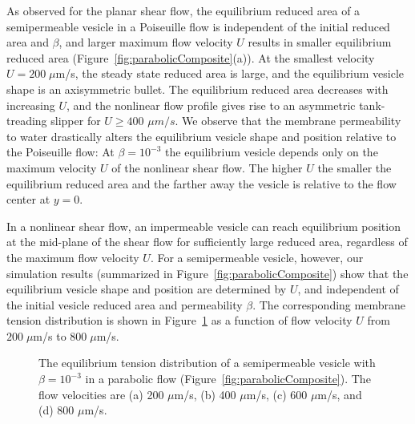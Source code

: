 \documentclass[prb,preprint,showpacs,preprintnumbers,amsmath,amssymb,longbibliography]{revtex4-1}
\begin{document}
As observed for the planar shear flow, the equilibrium reduced area of a
semipermeable vesicle in a Poiseuille flow is independent of the initial
reduced area and $\beta$, and  larger maximum flow velocity $U$ results
in smaller equilibrium reduced area
(Figure~\ref{fig:parabolicComposite}(a)). At the smallest velocity $U=
200\; \mu$m/s, the steady state reduced area is large, and the
equilibrium vesicle shape is an axisymmetric bullet. The equilibrium
reduced area decreases with increasing $U$, and the nonlinear flow
profile gives rise to an asymmetric tank-treading slipper for $U\ge 400$
$\mu m/s$. We observe that the membrane permeability to water
drastically alters the equilibrium vesicle shape and position relative
to the Poiseuille flow: At $\beta=10^{-3}$ the equilibrium vesicle
depends only on the maximum velocity $U$ of the nonlinear shear flow.
The higher $U$ the smaller the equilibrium reduced area and the farther
away the vesicle is relative to the flow center at $y=0$.  

In a nonlinear shear flow, an impermeable vesicle can reach equilibrium
position at the mid-plane of the shear flow for sufficiently large
reduced area, regardless of the maximum flow velocity $U$. For a
semipermeable vesicle, however, our simulation results (summarized in
Figure~\ref{fig:parabolicComposite}) show that the equilibrium vesicle
shape and position are determined by $U$, and independent of the initial
vesicle reduced area and permeability $\beta$. The corresponding
membrane tension distribution is shown in
Figure~\ref{fig:parabolicTensions} as a function of flow velocity $U$
from $200\;\mu$m/s to $800 \;\mu$m/s.

\begin{figure}[htp]
  \centering
  \caption{\label{fig:parabolicTensions} The equilibrium tension
  distribution of a semipermeable vesicle with $\beta=10^{-3}$ in a
  parabolic flow (Figure~\ref{fig:parabolicComposite}). The flow
  velocities are (a) 200 $\mu$m/s, (b) 400 $\mu$m/s, (c) 600 $\mu$m/s,
  and (d) 800 $\mu$m/s.}
\end{figure}
\end{document}

